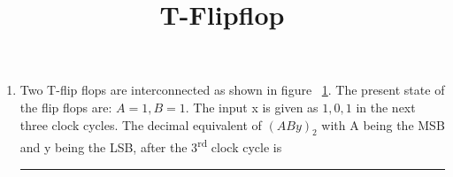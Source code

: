 \documentclass{article}
\begin{document}
\title{T-Flipflop}
\begin{enumerate}
	\item Two T-flip flops are interconnected as shown in figure ~\ref{fig:tff1}. The present state of the flip flops are: $A = 1, B = 1$. The input x is given as $1, 0, 1$ in the next three clock cycles. The decimal equivalent of $(ABy)_{2}$ with A being the MSB and y being the LSB, after the 3\textsuperscript{rd} clock cycle is \rule{12mm}{0.4pt}

		\vspace{1cm}
	\begin{figure}[ht]
		\centering
		
		\caption{}
		\label{fig:tff1}
	\end{figure}
\end{enumerate}
\end{document}

